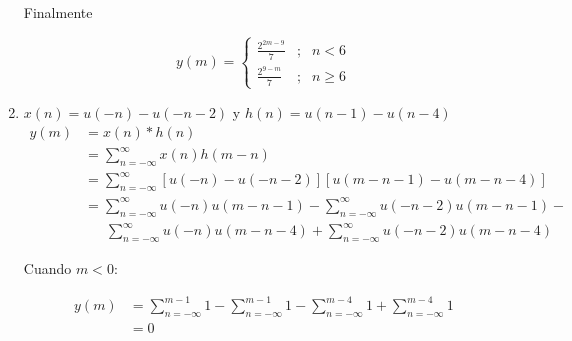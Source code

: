 \documentclass[a4paper,12pt,final]{article}
\begin{document}
\begin{enumerate}[label=\alph*)]
          \noindent Finalmente

          \begin{equation*}
            y\left(m\right) = \left\{
              \begin{array}{lcl}
                \displaystyle{\frac{2^{2m-9}}{7}} &;& n < 6 \\ [1em]
                \displaystyle{\frac{2^{9-m}}{7}}  &;& n \geq 6
              \end{array}
            \right.
          \end{equation*}

        \item $x\left(n\right) = u\left(-n\right) - u\left(-n-2\right)$ y $h\left(n\right) = u\left(n-1\right) - u\left(n-4\right)$
          \begin{equation*}
            \begin{split}
              y\left(m\right) & = x\left(n\right) * h\left(n\right) \\
                              & = \sum_{n=-\infty}^{\infty} x\left(n\right)h\left(m-n\right) \\
                              & = \sum_{n=-\infty}^{\infty} \left[u\left(-n\right) - u\left(-n-2\right)\right]
                                                            \left[u\left(m-n-1\right) - u\left(m-n-4\right)\right] \\
                              & = \sum_{n=-\infty}^{\infty} u\left(-n\right)u\left(m-n-1\right) - \sum_{n=-\infty}^{\infty} u\left(-n-2\right)u\left(m-n-1\right) - \\
                              & \phantom{=}\ \sum_{n=-\infty}^{\infty} u\left(-n\right)u\left(m-n-4\right) + \sum_{n=-\infty}^{\infty} u\left(-n-2\right)u\left(m-n-4\right)
            \end{split}
          \end{equation*}
          \vfill
          \newpage

          \noindent Cuando $m<0$:

          \begin{equation*}
            \begin{split}
              y\left(m\right) & = \sum_{n=-\infty}^{m-1} 1 -
                                  \sum_{n=-\infty}^{m-1} 1 -
                                  \sum_{n=-\infty}^{m-4} 1 +
                                  \sum_{n=-\infty}^{m-4} 1 \\
                              & = 0
            \end{split}
          \end{equation*}


\end{enumerate}
\end{document}
